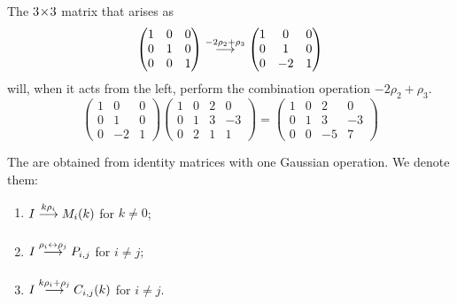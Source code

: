 \begin{example}
The \( 3 \! \times \! 3 \) matrix that arises as
\begin{equation*}
    \begin{pmatrix}
      1  &0  &0  \\
      0  &1  &0  \\
      0  &0  &1
    \end{pmatrix}
  \mathrel{ \mathop{\longrightarrow}\limits^{-2\rho_2+\rho_3\mathstrut}_{ \begin{subarray}{l} \relax \end{subarray}}}
    \begin{pmatrix}
      1  &0  &0  \\
      0  &1  &0  \\
      0  &-2 &1
    \end{pmatrix}
\end{equation*}
will, when it acts from the left,
perform the combination operation \( -2\rho_2+\rho_3 \).
\begin{equation*}
    \begin{pmatrix}
      1  &0  &0  \\
      0  &1  &0  \\
      0  &-2 &1
    \end{pmatrix}
    \begin{pmatrix}
      1  &0    &2  &0  \\
      0  &1    &3  &-3 \\
      0  &2    &1  &1
    \end{pmatrix}
  =
    \begin{pmatrix}
      1  &0    &2  &0  \\
      0  &1    &3  &-3 \\
      0  &0    &-5 &7
    \end{pmatrix}
\end{equation*}
\end{example}

\begin{definition}
The %
are obtained from identity matrices
with one Gaussian operation.
We denote them:
\begin{enumerate}
  \item \( I\mathrel{ \mathop{\longrightarrow}\limits^{k\rho_i\mathstrut}_{ \begin{subarray}{l} \relax \end{subarray}}}M_i(k) \) for \( k\neq 0 \);
  \item \( I\mathrel{ \mathop{\longrightarrow}\limits^{\rho_i\leftrightarrow\rho_j\mathstrut}_{ \begin{subarray}{l} \relax \end{subarray}}}P_{i,j} \) for 
          \( i\neq j \);
  \item \( I\mathrel{ \mathop{\longrightarrow}\limits^{k\rho_i+\rho_j\mathstrut}_{ \begin{subarray}{l} \relax \end{subarray}}}C_{i,j}(k) \) for \( i\neq j \).
\end{enumerate}
\end{definition}

